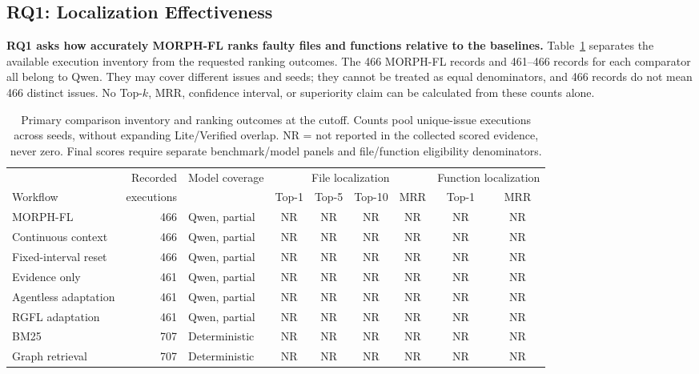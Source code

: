 \documentclass[letterpaper,journal]{IEEEtran}
\begin{document}
\subsection{RQ1: Localization Effectiveness}\label{sec:rq1}
\textbf{RQ1 asks how accurately MORPH-FL ranks faulty files and functions relative to the baselines.} Table~\ref{tab:eval-ranking} separates the available execution inventory from the requested ranking outcomes. The 466 MORPH-FL records and 461--466 records for each comparator all belong to Qwen. They may cover different issues and seeds; they cannot be treated as equal denominators, and 466 records do not mean 466 distinct issues. No Top-$k$, MRR, confidence interval, or superiority claim can be calculated from these counts alone.

\begin{table}[t]
\caption{Primary comparison inventory and ranking outcomes at the cutoff. Counts pool unique-issue executions across seeds, without expanding Lite/Verified overlap. NR = not reported in the collected scored evidence, never zero. Final scores require separate benchmark/model panels and file/function eligibility denominators.}\label{tab:eval-ranking}
\centering\scriptsize
\begin{tabular}{@{}lrlcccccc@{}}\toprule
 & Recorded & Model coverage & \multicolumn{4}{c}{File localization} & \multicolumn{2}{c}{Function localization}\\
\cmidrule(lr){4-7}\cmidrule(lr){8-9}
Workflow & executions & & Top-1 & Top-5 & Top-10 & MRR & Top-1 & MRR\\\midrule
MORPH-FL & 466 & Qwen, partial & NR & NR & NR & NR & NR & NR\\
Continuous context & 466 & Qwen, partial & NR & NR & NR & NR & NR & NR\\
Fixed-interval reset & 466 & Qwen, partial & NR & NR & NR & NR & NR & NR\\
Evidence only & 461 & Qwen, partial & NR & NR & NR & NR & NR & NR\\
Agentless adaptation & 461 & Qwen, partial & NR & NR & NR & NR & NR & NR\\
RGFL adaptation & 461 & Qwen, partial & NR & NR & NR & NR & NR & NR\\
BM25 & 707 & Deterministic & NR & NR & NR & NR & NR & NR\\
Graph retrieval & 707 & Deterministic & NR & NR & NR & NR & NR & NR\\\bottomrule
\end{tabular}
\end{table}
\end{document}
